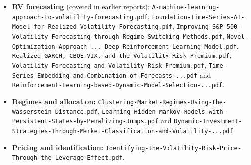 \documentclass{article}
\begin{document}
\begin{itemize}
\item \textbf{RV forecasting} (covered in earlier reports): \texttt{A-\allowbreak{}machine-\allowbreak{}learning-\allowbreak{}approach-\allowbreak{}to-\allowbreak{}volatility-\allowbreak{}forecasting.\allowbreak{}pdf}, \texttt{Foundation-\allowbreak{}Time-\allowbreak{}Series-\allowbreak{}AI-\allowbreak{}Model-\allowbreak{}for-\allowbreak{}Realized-\allowbreak{}Volatility-\allowbreak{}Forecasting.\allowbreak{}pdf}, \texttt{Improving-\allowbreak{}S\&P-\allowbreak{}500-\allowbreak{}Volatility-\allowbreak{}Forecasting-\allowbreak{}through-\allowbreak{}Regime-\allowbreak{}Switching-\allowbreak{}Methods.\allowbreak{}pdf}, \texttt{Novel-\allowbreak{}Optimization-\allowbreak{}Approach-\allowbreak{}.\allowbreak{}.\allowbreak{}.\allowbreak{}-\allowbreak{}Deep-\allowbreak{}Reinforcement-\allowbreak{}Learning-\allowbreak{}Model.\allowbreak{}pdf}, \texttt{Realized-\allowbreak{}GARCH,\allowbreak{}-\allowbreak{}CBOE-\allowbreak{}VIX,\allowbreak{}-\allowbreak{}and-\allowbreak{}the-\allowbreak{}Volatility-\allowbreak{}Risk-\allowbreak{}Premium.\allowbreak{}pdf}, \texttt{Volatility-\allowbreak{}Forecasting-\allowbreak{}and-\allowbreak{}Volatility-\allowbreak{}Risk-\allowbreak{}Premium.\allowbreak{}pdf}, \texttt{Time-\allowbreak{}Series-\allowbreak{}Embedding-\allowbreak{}and-\allowbreak{}Combination-\allowbreak{}of-\allowbreak{}Forecasts-\allowbreak{}.\allowbreak{}.\allowbreak{}.\allowbreak{}pdf} and \texttt{Reinforcement-\allowbreak{}Learning-\allowbreak{}based-\allowbreak{}Dynamic-\allowbreak{}Model-\allowbreak{}Selection-\allowbreak{}.\allowbreak{}.\allowbreak{}.\allowbreak{}pdf}.

\item \textbf{Regimes and allocation:} \texttt{Clustering-\allowbreak{}Market-\allowbreak{}Regimes-\allowbreak{}Using-\allowbreak{}the-\allowbreak{}Wasserstein-\allowbreak{}Distance.\allowbreak{}pdf}, \texttt{Learning-\allowbreak{}Hidden-\allowbreak{}Markov-\allowbreak{}Models-\allowbreak{}with-\allowbreak{}Persistent-\allowbreak{}States-\allowbreak{}by-\allowbreak{}Penalizing-\allowbreak{}Jumps.\allowbreak{}pdf} and \texttt{Dynamic-\allowbreak{}Investment-\allowbreak{}Strategies-\allowbreak{}Through-\allowbreak{}Market-\allowbreak{}Classification-\allowbreak{}and-\allowbreak{}Volatility-\allowbreak{}.\allowbreak{}.\allowbreak{}.\allowbreak{}pdf}.

\item \textbf{Pricing and identification:} \texttt{Identifying-\allowbreak{}the-\allowbreak{}Volatility-\allowbreak{}Risk-\allowbreak{}Price-\allowbreak{}Through-\allowbreak{}the-\allowbreak{}Leverage-\allowbreak{}Effect.\allowbreak{}pdf}.


\end{itemize}
\end{document}
